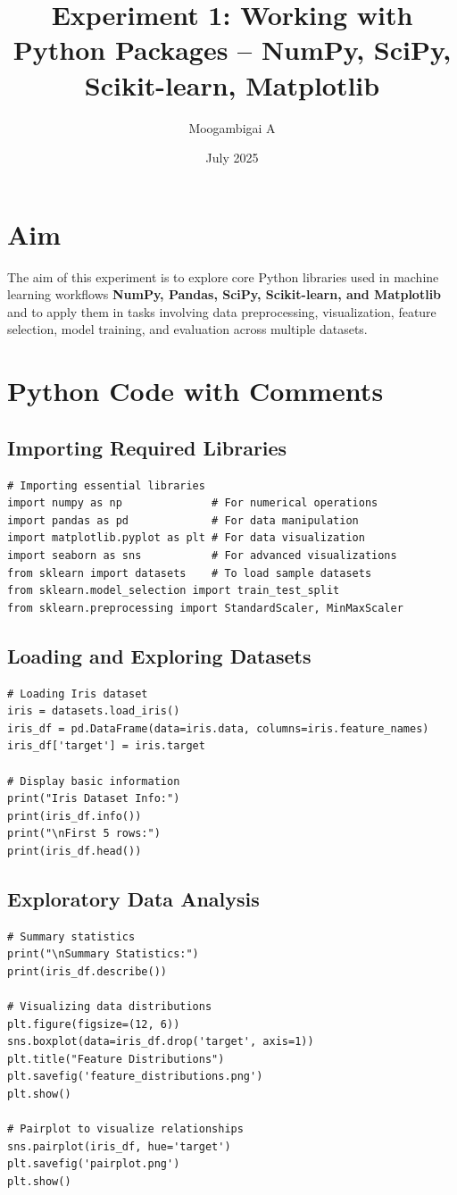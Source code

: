 \documentclass{article}
\title{Experiment 1: Working with Python Packages – NumPy, SciPy, Scikit-learn, Matplotlib}
\author{Moogambigai A}
\date{July 2025}
\begin{document}
\maketitle

\section{Aim}

The aim of this experiment is to explore core Python libraries used in machine learning workflows \textbf{NumPy, Pandas, SciPy, Scikit-learn, and Matplotlib} and to apply them in tasks involving data preprocessing, visualization, feature selection, model training, and evaluation across multiple datasets.

\section{Python Code with Comments}
\subsection{Importing Required Libraries}
\begin{verbatim}
# Importing essential libraries
import numpy as np              # For numerical operations
import pandas as pd             # For data manipulation
import matplotlib.pyplot as plt # For data visualization
import seaborn as sns           # For advanced visualizations
from sklearn import datasets    # To load sample datasets
from sklearn.model_selection import train_test_split
from sklearn.preprocessing import StandardScaler, MinMaxScaler
\end{verbatim}

\subsection{Loading and Exploring Datasets}
\begin{verbatim}
# Loading Iris dataset
iris = datasets.load_iris()
iris_df = pd.DataFrame(data=iris.data, columns=iris.feature_names)
iris_df['target'] = iris.target

# Display basic information
print("Iris Dataset Info:")
print(iris_df.info())
print("\nFirst 5 rows:")
print(iris_df.head())
\end{verbatim}

\subsection{Exploratory Data Analysis}
\begin{verbatim}
# Summary statistics
print("\nSummary Statistics:")
print(iris_df.describe())

# Visualizing data distributions
plt.figure(figsize=(12, 6))
sns.boxplot(data=iris_df.drop('target', axis=1))
plt.title("Feature Distributions")
plt.savefig('feature_distributions.png')
plt.show()

# Pairplot to visualize relationships
sns.pairplot(iris_df, hue='target')
plt.savefig('pairplot.png')
plt.show()
\end{verbatim}
\end{document}
